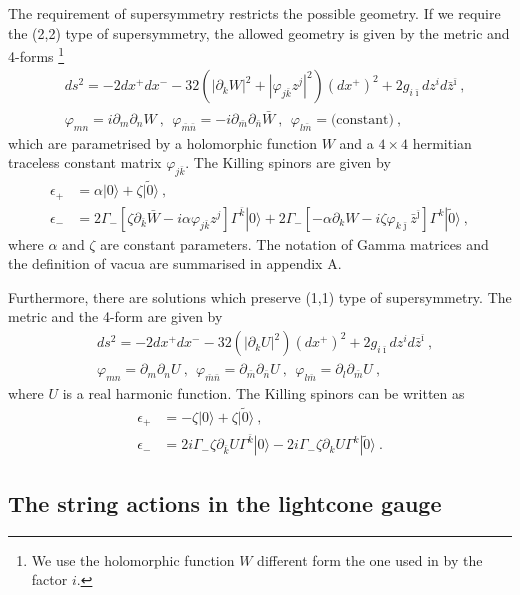 \documentclass[a4paper,12pt]{article}
\numberwithin{equation}{section}
\newcommand{\del}{\partial}
\newcommand{\ib}{\bar{\imath}}
\newcommand{\jb}{\bar{\jmath}}
\newcommand{\kb}{\bar{k}}
\newcommand{\zb}{\bar{z}}
\newcommand{\vp}{\varphi}
\newcommand{\vac}{|0\rangle}
\newcommand{\vact}{|\tilde 0\rangle}
\newcommand{\nn}{\nonumber\\}
\begin{document}
The requirement of supersymmetry restricts the possible geometry.
If we require the (2,2) type of supersymmetry,
the allowed geometry is given by the metric and 4-forms%
\footnote{We use the holomorphic function $W$ different form the
one used in \cite{Maldacena:2002fy} by the factor $i$.}
\begin{align}
 & ds^2=-2dx^{+}dx^{-}-32(|\del_k W|^2 + |\vp_{j\bar{k}} z^j|^2)(dx^{+})^2 
   + 2 g_{i\ib}  dz^{i}d\zb^{\ib} ~,\nn
 &\vp_{mn}= i \del_m\del_n W~,~~
  \vp_{\bar{m} \bar{n}}= -i \del_{\bar{m}}\del_{\bar{n}} \bar{W}~,~~
  \vp_{l\bar{m}} = \mbox{(constant)} ~,
\label{22solution}
\end{align}
which are parametrised by a holomorphic function $W$ and a 
$4 \times 4$ hermitian traceless constant matrix $\vp_{j\bar{k}}$.
The Killing spinors are given by
\begin{align}
 \epsilon_{+}&= \alpha \vac + \zeta \vact~,\nn
 \epsilon_{-}&= 2 \Gamma_{-} 
 [ \zeta \del_{\kb} \bar W - i \alpha \vp_{j\bar{k}} z^j ] \Gamma^{\kb}\vac
             + 2 \Gamma_{-} 
 [ - \alpha \del_{k} W - i\zeta \vp_{k\jb} \bar{z}^{\jb} ] 
              \Gamma^{k} \vact~,
\label{22killing}
\end{align}
where $\alpha$ and $\zeta$ are constant parameters. 
The notation of Gamma matrices and the definition of vacua are
summarised in appendix A. 

Furthermore, there are solutions which preserve (1,1) type of supersymmetry.
The metric and the 4-form are given by
\begin{align}
 & ds^2=-2dx^{+}dx^{-}-32(|\del_k U|^2 )(dx^{+})^2 
   + 2 g_{i\ib}dz^{i}d\zb^{\ib} ~,\nn
 &\vp_{mn}=\del_m\del_n U~,~~
  \vp_{\bar{m} \bar{n}}=\del_{\bar{m}}\del_{\bar{n}} U~,~~
  \vp_{l\bar{m}} =  \del_{l}\del_{\bar{m}} U~,
\end{align}
where $U$ is a real harmonic function. 
The Killing spinors can be written as 
\begin{align}
 \epsilon_{+}&= - \zeta \vac + \zeta \vact~,\nn
 \epsilon_{-}&= 2i \Gamma_{-} \zeta \del_{\kb} U \Gamma^{\kb}\vac
             - 2i \Gamma_{-} \zeta \del_{k} U \Gamma^{k} \vact~.
 \label{11killing}
\end{align}

\subsection{The string actions in the lightcone gauge}
\label{HVsol}
\end{document}
